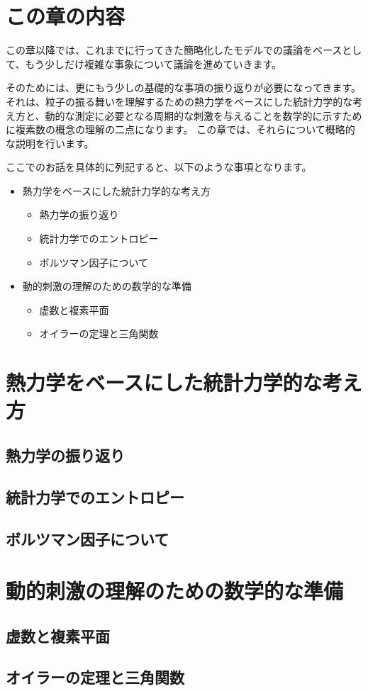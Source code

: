 \documentclass[uplatex,dvipdfmx,a4paper,11pt]{jsarticle}
\begin{document}
\section*{この章の内容}

この章以降では、これまでに行ってきた簡略化したモデルでの議論をベースとして、もう少しだけ複雑な事象について議論を進めていきます。

そのためには、更にもう少しの基礎的な事項の振り返りが必要になってきます。
それは、粒子の振る舞いを理解するための熱力学をベースにした統計力学的な考え方と、動的な測定に必要となる周期的な刺激を与えることを数学的に示すために複素数の概念の理解の二点になります。
この章では、それらについて概略的な説明を行います。

ここでのお話を具体的に列記すると、以下のような事項となります。
\begin{boxnote}
    \begin{itemize}
        \item 熱力学をベースにした統計力学的な考え方
        \begin{itemize}
            \item 熱力学の振り返り
            \item 統計力学でのエントロピー
            \item ボルツマン因子について
        \end{itemize}
        \item 動的刺激の理解のための数学的な準備
        \begin{itemize}
            \item 虚数と複素平面
            \item オイラーの定理と三角関数
        \end{itemize}
    \end{itemize}
\end{boxnote}


\section{熱力学をベースにした統計力学的な考え方}
\subsection{熱力学の振り返り}
\subsection{統計力学でのエントロピー}
\subsection{ボルツマン因子について}

\section{動的刺激の理解のための数学的な準備}
\subsection{虚数と複素平面}
\subsection{オイラーの定理と三角関数}
\end{document}
